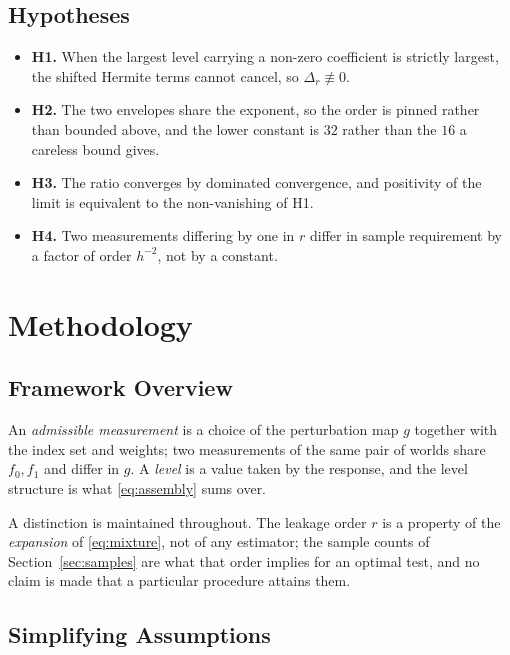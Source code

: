 \subsection{Hypotheses}

\begin{itemize}
\item \textbf{H1.} When the largest level carrying a non-zero coefficient is strictly
largest, the shifted Hermite terms cannot cancel, so $\Delta_{r}\not\equiv0$.
\item \textbf{H2.} The two envelopes share the exponent, so the order is pinned rather than
bounded above, and the lower constant is $32$ rather than the $16$ a careless bound gives.
\item \textbf{H3.} The ratio converges by dominated convergence, and positivity of the limit
is equivalent to the non-vanishing of H1.
\item \textbf{H4.} Two measurements differing by one in $r$ differ in sample requirement by a
factor of order $h^{-2}$, not by a constant.
\end{itemize}

\section{Methodology}
\label{sec:setting}

\subsection{Framework Overview}

An \emph{admissible measurement} is a choice of the perturbation map $g$ together with the
index set and weights; two measurements of the same pair of worlds share $f_{0},f_{1}$ and
differ in $g$. A \emph{level} is a value taken by the response, and the level structure is
what \eqref{eq:assembly} sums over.

A distinction is maintained throughout. The leakage order $r$ is a property of the
\emph{expansion} of \eqref{eq:mixture}, not of any estimator; the sample counts of
Section~\ref{sec:samples} are what that order implies for an optimal test, and no claim is
made that a particular procedure attains them.

\subsection{Simplifying Assumptions}

